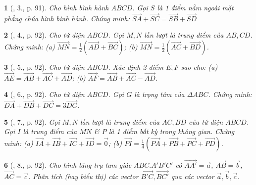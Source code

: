 \documentclass{article}
\newtheorem{baitoan}{}
\begin{document}
\begin{baitoan}[\cite{SGK_Toan_11_hinh_hoc_co_ban}, 3., p. 91]
	Cho hình bình hành $ABCD$. Gọi $S$ là 1 điểm nằm ngoài mặt phẳng chứa hình bình hành. Chứng minh: $\overrightarrow{SA} + \overrightarrow{SC} = \overrightarrow{SB} + \overrightarrow{SD}$
\end{baitoan}

\begin{baitoan}[\cite{SGK_Toan_11_hinh_hoc_co_ban}, 4., p. 92]
	Cho tứ diện $ABCD$. Gọi $M,N$ lần lượt là trung điểm của $AB,CD$. Chứng minh: (a) $\overrightarrow{MN} = \frac{1}{2}(\overrightarrow{AD} + \overrightarrow{BC})$; (b) $\overrightarrow{MN} = \frac{1}{2}(\overrightarrow{AC} + \overrightarrow{BD})$.
\end{baitoan}

\begin{baitoan}[\cite{SGK_Toan_11_hinh_hoc_co_ban}, 5., p. 92]
	Cho tứ diện $ABCD$. Xác định 2 điểm $E,F$ sao cho: (a) $\overrightarrow{AE} = \overrightarrow{AB} + \overrightarrow{AC} + \overrightarrow{AD}$; (b) $\overrightarrow{AF} = \overrightarrow{AB} + \overrightarrow{AC} - \overrightarrow{AD}$.
\end{baitoan}

\begin{baitoan}[\cite{SGK_Toan_11_hinh_hoc_co_ban}, 6., p. 92]
	Cho tứ diện $ABCD$. Gọi $G$ là trọng tâm của $\Delta ABC$. Chứng minh: $\overrightarrow{DA} + \overrightarrow{DB} + \overrightarrow{DC} = 3\overrightarrow{DG}$.
\end{baitoan}

\begin{baitoan}[\cite{SGK_Toan_11_hinh_hoc_co_ban}, 7., p. 92]
	Gọi $M,N$ lần lượt là trung điểm của $AC,BD$ của tứ diện $ABCD$. Gọi $I$ là trung điểm của $MN$ \& $P$ là 1 điểm bất kỳ trong không gian. Chứng minh: (a) $\overrightarrow{IA} + \overrightarrow{IB} + \overrightarrow{IC} + \overrightarrow{ID} = \vec{0}$; (b) $\overrightarrow{PI} = \frac{1}{4}(\overrightarrow{PA} + \overrightarrow{PB} + \overrightarrow{PC} + \overrightarrow{PD})$.
\end{baitoan}

\begin{baitoan}[\cite{SGK_Toan_11_hinh_hoc_co_ban}, 8., p. 92]
	Cho hình lăng trụ tam giác $ABC.A'B'C'$ có $\overrightarrow{AA'} = \vec{a}$, $\overrightarrow{AB} = \vec{b}$, $\overrightarrow{AC} = \vec{c}$. Phân tích (hay biểu thị) các vector $\overrightarrow{B'C},\overrightarrow{BC'}$ qua các vector $\vec{a},\vec{b},\vec{c}$.
\end{baitoan}
\end{document}
